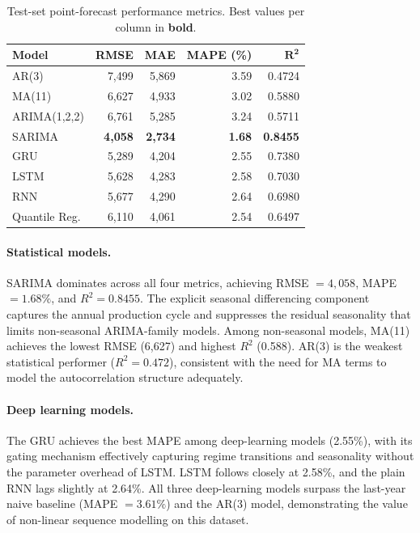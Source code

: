 \documentclass[12pt,a4paper]{article}
\begin{document}
\begin{table}[H]
\centering
\caption{Test-set point-forecast performance metrics. Best values per column in \textbf{bold}.}
\label{tab:results}
\begin{tabular}{@{}lrrrr@{}}
\toprule
\textbf{Model} & \textbf{RMSE} & \textbf{MAE} & \textbf{MAPE (\%)} & $\boldsymbol{R^2}$ \\
\midrule
AR(3)           & 7,499 & 5,869 & 3.59           & 0.4724 \\
MA(11)          & 6,627 & 4,933 & 3.02           & 0.5880 \\
ARIMA(1,2,2)    & 6,761 & 5,285 & 3.24           & 0.5711 \\
SARIMA          & \textbf{4,058} & \textbf{2,734} & \textbf{1.68} & \textbf{0.8455} \\
GRU             & 5,289 & 4,204 & 2.55           & 0.7380 \\
LSTM            & 5,628 & 4,283 & 2.58           & 0.7030 \\
RNN             & 5,677 & 4,290 & 2.64           & 0.6980 \\
Quantile Reg.   & 6,110 & 4,061 & 2.54           & 0.6497 \\
\bottomrule
\end{tabular}
\end{table}

\paragraph{Statistical models.}
SARIMA dominates across all four metrics, achieving RMSE $= 4{,}058$, MAPE $= 1.68\%$, and $R^2 = 0.8455$. The explicit seasonal differencing component captures the annual production cycle and suppresses the residual seasonality that limits non-seasonal ARIMA-family models. Among non-seasonal models, MA(11) achieves the lowest RMSE (6,627) and highest $R^2$ (0.588). AR(3) is the weakest statistical performer ($R^2 = 0.472$), consistent with the need for MA terms to model the autocorrelation structure adequately.

\paragraph{Deep learning models.}
The GRU achieves the best MAPE among deep-learning models (2.55\%), with its gating mechanism effectively capturing regime transitions and seasonality without the parameter overhead of LSTM. LSTM follows closely at 2.58\%, and the plain RNN lags slightly at 2.64\%. All three deep-learning models surpass the last-year naive baseline (MAPE $= 3.61\%$) and the AR(3) model, demonstrating the value of non-linear sequence modelling on this dataset.
\end{document}
